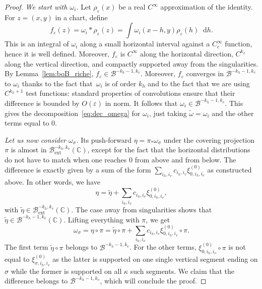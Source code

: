 \documentclass[JEP,XML,SOM,Unicode]{cedram}
\newcommand{\ext}{\mathrm{ext}}
\newcommand{\boB}{\mathcal{B}}
\newcommand{\CC}{\mathbb{C}}
\newcommand{\dd}{\mathop{}\!\mathrm{d}}
\let\epsilon\varepsilon
\theoremstyle{definition}
\numberwithin{equation}{section}
\begin{document}
\begin{proof}
\emph{We start with $\omega_i$.} Let $\rho_\epsilon(x)$ be a real $C^\infty$
approximation of the identity. For $z = (x,y)$ in a chart, define
\begin{equation*}
f_\epsilon(z) = \omega_i * \rho_\epsilon (z) = \int \omega_i(x-h, y) \rho_\epsilon(h) \dd h.
\end{equation*}
This is an integral of $\omega_i$ along a small horizontal interval against a
$C^\infty_c$ function, hence it is well defined. Moreover, $f_\epsilon$ is
$C^\infty$ along the horizontal direction, $C^{k_v}$ along the vertical
direction, and compactly supported away from the singularities. By
Lemma~\ref{lem:boB_riche}, $f_\epsilon \in \boB^{-k_h-1, k_v}$. Moreover,
$f_\epsilon$ converges in $\boB^{-k_h-1, k_v}$ to $\omega_i$ thanks to the
fact that~$\omega_i$ is of order $k_h$ and to the fact that we are using
$C^{k_h+1}$ test functions: standard properties of convolutions ensure that
their difference is bounded by $O(\epsilon)$ in norm. It follows that
$\omega_i \in \boB^{-k_h-1, k_v}$. This gives the
decomposition~\eqref{eq:dec_omega} for $\omega_i$, just taking
$\tilde\omega=\omega_i$ and the other terms equal to $0$.

\emph{Let us now consider $\omega_\sigma$.} Its push-forward $\eta =\pi_*
\omega_\sigma$ under the covering projection~$\pi$ is almost in
$\boB_{\ext}^{-k_h, k_v}(\CC)$, except for the fact that the horizontal
distributions do not have to match when one reaches $0$ from above and from
below. The difference is exactly given by a sum of the form $\sum_{i_h, i_v}
c_{i_h, i_v} \xi^{(0)}_{0, i_h, i_v}$ as constructed above. In other words,
we have
\begin{equation*}
\eta = \tilde \eta + \sum_{i_h, i_v} c_{i_h, i_v} \xi^{(0)}_{0, i_h, i_v},
\end{equation*}
with $\tilde\eta \in \boB_{\ext}^{-k_h, k_v}(\CC)$. The case away from
singularities shows that $\tilde \eta \in \boB^{-k_h-1, k_v}(\CC)$. Lifting
everything with $\pi$, we get
\begin{equation*}
\omega_\sigma = \eta \circ \pi = \tilde \eta \circ \pi + \sum_{i_h, i_v} c_{i_h, i_v} \xi^{(0)}_{0, i_h, i_v} \circ \pi.
\end{equation*}
The first term $\tilde \eta \circ \pi$ belongs to $\boB^{-k_h-1, k_v}$. For
the other terms, $\xi^{(0)}_{0, i_h, i_v} \circ \pi$ is not equal to
$\xi^{(0)}_{\sigma, i_h, i_v}$ as the latter is supported on one single
vertical segment ending on $\sigma$ while the former is supported on all
$\kappa$ such segments. We claim that the difference belongs to
$\boB^{-k_h-1, k_v}$, which will conclude the proof.


\end{proof}
\end{document}
